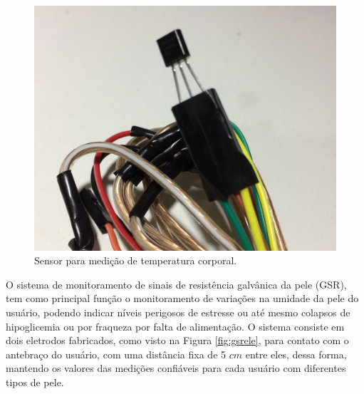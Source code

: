 \begin{figure}[h!]
    \begin{center}
        \includegraphics[scale=0.075]{figuras/temp_ele.jpg}
    \end{center}
    \caption{Sensor para medição de temperatura corporal.}
    \label{fig:tempele}
\end{figure}


O sistema de monitoramento de sinais de resistência galvânica da pele (GSR),
tem como principal função o monitoramento de variações na umidade da pele do
usuário, podendo indicar níveis perigosos de estresse ou até mesmo colapsos de
hipoglicemia ou por fraqueza por falta de alimentação. O sistema consiste em
dois eletrodos fabricados, como visto na Figura \ref{fig:gsrele}, para contato com o
antebraço do usuário, com uma distância fixa de 5 $cm$ entre eles, dessa forma,
mantendo os valores das medições confiáveis para cada usuário com diferentes tipos de pele.

